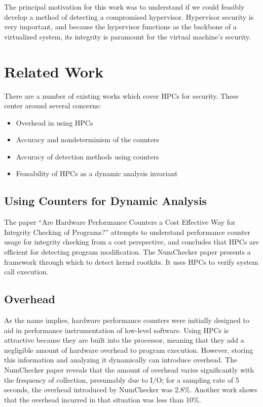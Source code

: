 \documentclass[notitlepage]{article}
\begin{document}
The principal motivation for this work was to understand if we could feasibly
develop a method of detecting a compromised hypervisor. Hypervisor security is
very important, and because the hypervisor functions as the backbone of a
virtualized system, its integrity is paramount for the virtual machine's
security.


\section{Related Work}
There are a number of existing works which cover HPCs for security. These center
around several concerns:
\begin{itemize}
    \item Overhead in using HPCs
    \item Accuracy and nondeterminism of the counters
    \item Accuracy of detection methods using counters
    \item Feasability of HPCs as a dynamic analysis invariant
\end{itemize}

\subsection{Using Counters for Dynamic Analysis}
The paper ``Are Hardware Performance Counters a Cost Effective Way for Integrity
Checking of Programs?'' attempts to understand performance counter usage for
integrity checking from a cost perspective, and concludes that HPCs are
efficient for detecting program modification\cite{arehardware}. The
NumChecker\cite{numchecker} paper presents a framework through which to detect
kernel rootkits. It uses HPCs to verify system call execution.

\subsection{Overhead}
As the name implies, hardware performance counters were initially designed to
aid in performance instrumentation of low-level software. Using HPCs is
attractive because they are built into the processor, meaning that they add a
negligible amount of hardware overhead to program execution. However, storing
this information and analyzing it dynamically can introduce overhead. The
NumChecker\cite{numchecker} paper reveals that the amount of overhead varies
significantly with the frequency of collection,  presumably due to I/O; for a
sampling rate of 5 seconds, the overhead introduced by NumChecker was
2.8\%\cite{numchecker}. Another work shows that the overhead incurred in that
situation was less than 10\%\cite{arehardware}.
\end{document}
